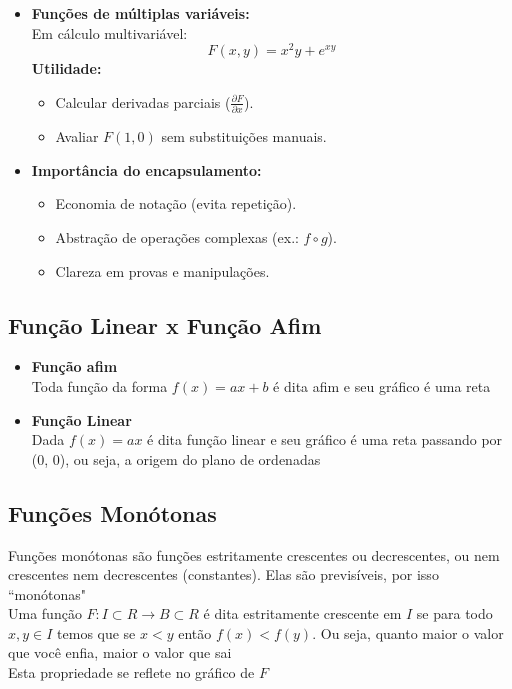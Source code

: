 \documentclass{article}
\begin{document}
\begin{itemize}
    \item \textbf{Funções de múltiplas variáveis:} \\
    Em cálculo multivariável:
    \[
    F(x, y) = x^2 y + e^{xy}
    \]
    \textbf{Utilidade:}
    \begin{itemize}
        \item Calcular derivadas parciais (\( \frac{\partial F}{\partial x} \)).
        \item Avaliar \( F(1, 0) \) sem substituições manuais.
    \end{itemize}

    \item \textbf{Importância do encapsulamento:}
    \begin{itemize}
        \item Economia de notação (evita repetição).
        \item Abstração de operações complexas (ex.: \( f \circ g \)).
        \item Clareza em provas e manipulações.
    \end{itemize}
\end{itemize}

\subsection{Função Linear x Função Afim}
\begin{itemize}
    \item \textbf{Função afim}
    \\[5pt]
    Toda função da forma $f(x) = ax + b$ é dita afim e seu gráfico é uma reta
    \item \textbf{Função Linear}
    \\[5pt]
    Dada $f(x) = ax$ é dita função linear e seu gráfico é uma reta passando por (0, 0), ou seja, a origem do plano de ordenadas
\end{itemize}

\subsection{Funções Monótonas}
Funções monótonas são funções estritamente crescentes ou decrescentes, ou nem crescentes nem decrescentes (constantes). Elas são previsíveis, por isso ``monótonas"
\\[10pt]
Uma função $F: I \subset R \xrightarrow{} B \subset R$ é dita estritamente crescente em $I$ se para todo $x, y \in I$ temos que se $x < y$ então $f(x) < f(y)$. Ou seja, quanto maior o valor que você enfia, maior o valor que sai
\\[10pt]
Esta propriedade se reflete no gráfico de $F$
\end{document}
